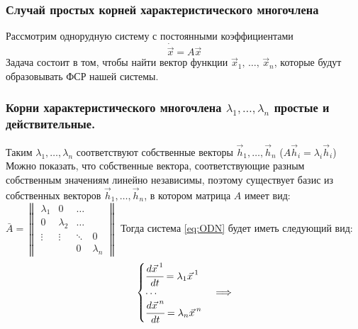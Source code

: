 \subsubsection*{Случай простых корней характеристического многочлена}
Рассмотрим однорудную систему с постоянными коэффициентами \begin{equation}
  \dot{\vec{x}} = A \vec{x} \label{eq:ODN}
\end{equation} 
Задача состоит в том, чтобы найти вектор функции $\vec{x}_1, \, \dots, \, \vec{x}_n$, которые будут образовывать ФСР нашей системы. 

\subsubsection*{Корни характеристического многочлена $\lambda_1, \dots, \lambda_n$ простые и действительные.}

Таким $\lambda_1, \dots, \lambda_n$ соответствуют собственные векторы $\vec{h}_1, \dots, \vec{h}_n$ ($A \vec{h}_i = \lambda_i \vec{h}_i$)
Можно показать, что собственные вектора, соответствующие разным собственным значениям линейно независимы, 
поэтому существует базис из собственных векторов $\vec{h}_1, \dots, \vec{h}_n$, в котором матрица $A$ имеет вид: 
$\bar{A} = \begin{Vmatrix} \lambda_1 & 0 & \ldots & \\ 0 & \lambda_2 & \ldots \\  \vdots& \vdots & \ddots &  0 \\ & & 0 & \lambda_n \end{Vmatrix}$ 
Тогда система \eqref{eq:ODN} будет иметь следующий вид: 
\[ \begin{cases}
    \cfrac{d \vec{x\,}^1}{dt} = \lambda_1 \vec{x \,}^1 \\
    \cdots \\
    \cfrac{d \vec{x \,}^n}{dt} = \lambda_n \vec{x \,}^n
\end{cases} \Longrightarrow \]

